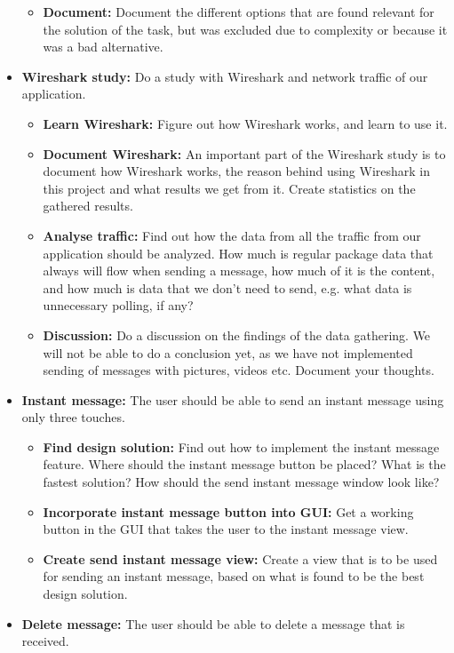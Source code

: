 \begin{itemize}
\begin{itemize}
\item{}\textbf{Document:} Document the different options that are found relevant for the solution of the task, but was excluded due to complexity or because it was a bad alternative.
\end{itemize}
\item{}\textbf{Wireshark study:} Do a study with Wireshark and network traffic of our application.
\begin{itemize}
\item{}\textbf{Learn Wireshark:} Figure out how Wireshark works, and learn to use it.
\item{}\textbf{Document Wireshark:} An important part of the Wireshark study is to document how Wireshark works, the reason behind using Wireshark in this project and what results we get from it. Create statistics on the gathered results.
\item{}\textbf{Analyse traffic:} Find out how the data from all the traffic from our application should be analyzed. How much is regular package data that always will flow when sending a message, how much of it is the content, and how much is data that we don’t need to send, e.g. what data is unnecessary polling, if any?
\item{}\textbf{Discussion:} Do a discussion on the findings of the data gathering. We will not be able to do a conclusion yet, as we have not implemented sending of messages with pictures, videos etc. Document your thoughts.
\end{itemize}
\item{}\textbf{Instant message:} The user should be able to send an instant message using only three touches.
\begin{itemize}
\item{}\textbf{Find design solution:} Find out how to implement the instant message feature. Where should the instant message button be placed? What is the fastest solution? How should the send instant message window look like?
\item{}\textbf{Incorporate instant message button into GUI:} Get a working button in the GUI that takes the user to the instant message view.
\item{}\textbf{Create send instant message view:} Create a view that is to be used for sending an instant message, based on what is found to be the best design solution.
\end{itemize}
\item{}\textbf{Delete message:} The user should be able to delete a message that is received.

\end{itemize}
